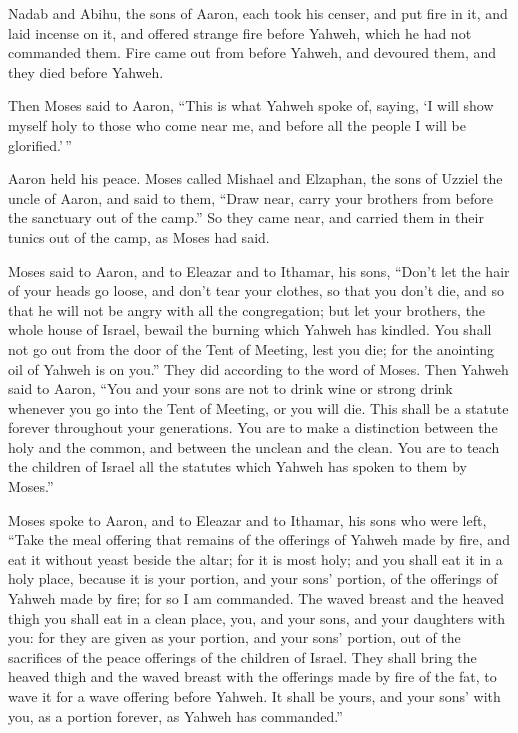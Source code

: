  Nadab and Abihu, the sons of Aaron, each took his censer,
and put fire in it, and laid incense on it, and offered strange fire
before Yahweh, which he had not commanded them.  Fire came
out from before Yahweh, and devoured them, and they died before Yahweh.

 Then Moses said to Aaron, ``This is what Yahweh spoke of,
saying, `I will show myself holy to those who come near me, and before
all the people I will be glorified.'\,''

Aaron held his peace.  Moses called Mishael and Elzaphan,
the sons of Uzziel the uncle of Aaron, and said to them, ``Draw near,
carry your brothers from before the sanctuary out of the camp.''
 So they came near, and carried them in their tunics out
of the camp, as Moses had said.

 Moses said to Aaron, and to Eleazar and to Ithamar, his
sons, ``Don't let the hair of your heads go loose, and don't tear your
clothes, so that you don't die, and so that he will not be angry with
all the congregation; but let your brothers, the whole house of Israel,
bewail the burning which Yahweh has kindled.  You shall
not go out from the door of the Tent of Meeting, lest you die; for the
anointing oil of Yahweh is on you.'' They did according to the word of
Moses.  Then Yahweh said to Aaron,  ``You
and your sons are not to drink wine or strong drink whenever you go into
the Tent of Meeting, or you will die. This shall be a statute forever
throughout your generations.  You are to make a
distinction between the holy and the common, and between the unclean and
the clean.  You are to teach the children of Israel all
the statutes which Yahweh has spoken to them by Moses.''

 Moses spoke to Aaron, and to Eleazar and to Ithamar, his
sons who were left, ``Take the meal offering that remains of the
offerings of Yahweh made by fire, and eat it without yeast beside the
altar; for it is most holy;  and you shall eat it in a
holy place, because it is your portion, and your sons' portion, of the
offerings of Yahweh made by fire; for so I am commanded. 
The waved breast and the heaved thigh you shall eat in a clean place,
you, and your sons, and your daughters with you: for they are given as
your portion, and your sons' portion, out of the sacrifices of the peace
offerings of the children of Israel.  They shall bring
the heaved thigh and the waved breast with the offerings made by fire of
the fat, to wave it for a wave offering before Yahweh. It shall be
yours, and your sons' with you, as a portion forever, as Yahweh has
commanded.''

